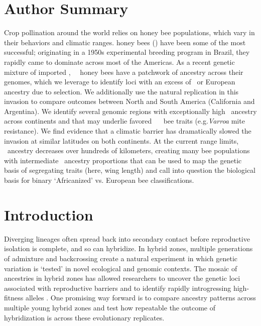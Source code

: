 \section*{Author Summary}

Crop pollination around the world relies on  honey bee populations, which vary in their behaviors and climatic ranges.  honey bees () have been some of the most  successful; originating in a 1950s experimental breeding program in Brazil, they rapidly came to dominate across most of the Americas. As a recent genetic mixture of  imported ,
\africanized\ \hyb\ honey bees have a patchwork of ancestry across their genomes, which we leverage to identify loci with an excess of \scutellata\ or European ancestry due to selection. We additionally use the natural replication in this invasion to compare outcomes between North and South America (California and Argentina). We identify several genomic regions with exceptionally high \scutellata\ ancestry across continents and that may underlie favored \africanized\ \hyb\  bee traits (e.g.\textit{Varroa} mite resistance). We find evidence that a climatic barrier has dramatically slowed the invasion at similar latitudes on both continents. At the current range limits, \scutellata\ ancestry decreases over hundreds of kilometers, creating many bee populations with intermediate \scutellata\ ancestry proportions that can be used to map the genetic basis of segregating traits (here, wing length) and call into question the biological basis for binary ‘Africanized’ vs. European bee classifications.


\section*{Introduction}

Diverging lineages often spread back into secondary contact before reproductive isolation is complete, and so can hybridize. In hybrid zones, multiple generations of admixture and backcrossing create a natural experiment in which genetic variation is ‘tested’ in novel ecological and genomic contexts. The mosaic of ancestries in hybrid zones has allowed researchers to uncover the genetic loci associated with reproductive barriers  and to identify rapidly introgressing high-fitness alleles . One promising way forward is to compare ancestry patterns across multiple young hybrid zones and test how repeatable the outcome of hybridization is across these evolutionary replicates.

